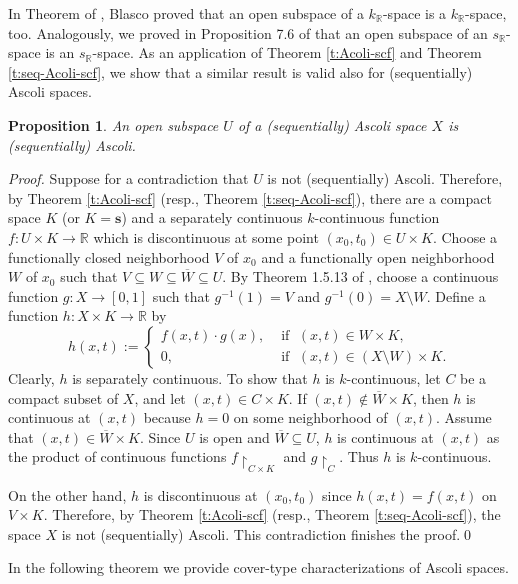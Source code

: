\documentclass[preprint,11pt]{elsarticle}
\newtheorem{proposition}[theorem]{Proposition}
\numberwithin{equation}{section}
\numberwithin{theorem}{section}
\newcommand{\IR}{\mathbb{R}}
\newcommand{\SM}{{\setminus}}
\begin{document}
In Theorem of \cite{Blasco-78}, Blasco proved that an open subspace of a $k_\IR$-space is a $k_\IR$-space, too. Analogously, we proved in Proposition 7.6 of \cite{GR-kR-sR} that  an open subspace of an $s_\IR$-space is an $s_\IR$-space. As an application of Theorem \ref{t:Acoli-scf} and Theorem \ref{t:seq-Acoli-scf}, we show that a similar result is valid also for (sequentially) Ascoli spaces.
\begin{proposition} \label{p:open-Ascoli}
An open subspace $U$ of a (sequentially) Ascoli space $X$ is (sequentially) Ascoli.
\end{proposition}

\begin{proof}
Suppose for a contradiction that $U$ is not  (sequentially) Ascoli. Therefore, by Theorem \ref{t:Acoli-scf} (resp., Theorem \ref{t:seq-Acoli-scf}), there are a compact space $K$ (or $K=\mathbf{s}$) and a separately continuous $k$-continuous function $f:U\times K\to \IR$ which is  discontinuous at some point $(x_0,t_0)\in U\times K$. Choose a functionally closed neighborhood $V$ of $x_0$ and a functionally open neighborhood $W$ of $x_0$ such that $V\subseteq W\subseteq \overline{W}\subseteq U$. By Theorem 1.5.13 of \cite{Eng}, choose a continuous function $g:X\to[0,1]$ such that $g^{-1}(1)=V$ and $g^{-1}(0)=X\SM W$. Define a function $h:X\times K\to \IR$ by
\[
h(x,t):=\left\{
\begin{aligned}
f(x,t)\cdot g(x), & \mbox{ if } \; (x,t)\in W\times K,\\
0, &  \mbox{ if } \; (x,t)\in (X\SM W)\times K.
\end{aligned}
\right.
\]
Clearly, $h$ is separately continuous. To show that $h$ is $k$-continuous, let $C$ be a compact subset of $X$, and let $(x,t)\in C\times K$. If $(x,t)\not\in \overline{W}\times K$, then $h$ is continuous at $(x,t)$ because $h=0$ on some neighborhood of $(x,t)$. Assume that $(x,t)\in \overline{W}\times K$. Since $U$ is open and $\overline{W}\subseteq U$, $h$ is continuous at $(x,t)$  as the product of continuous functions $f{\restriction}_{C\times K}$ and $g{\restriction}_C$. Thus $h$ is $k$-continuous.

On the other hand, $h$ is discontinuous at $(x_0,t_0)$ since $h(x,t)=f(x,t)$ on $V\times K$. Therefore, by Theorem \ref{t:Acoli-scf} (resp., Theorem \ref{t:seq-Acoli-scf}), the space $X$ is not (sequentially) Ascoli. This contradiction finishes the proof.\qed
\end{proof}


In the following theorem we provide cover-type characterizations of Ascoli spaces.
\end{document}
